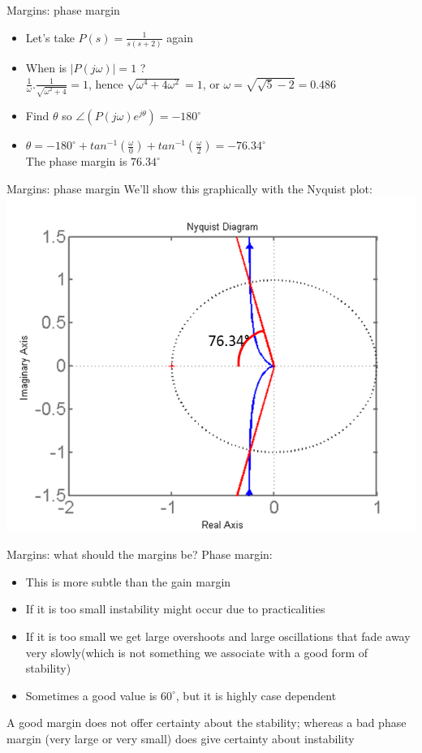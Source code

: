 \begin{frame}{Margins: phase margin}
\begin{itemize}
\item Let’s take $P(s) = \frac{1}{s(s+2)}$ again
\item When is $|P(j\omega)|=1$ ?
\\ $\frac{1}{\omega}.\frac{1}{\sqrt{\omega^2+4}} =1$, hence $\sqrt{\omega^4+4\omega^2}=1$, or $\omega= \sqrt{\sqrt{5}-2}=0.486$
\item Find $\theta$ so $\angle (P(j\omega)e^{j\theta}) = -180^{\circ}$
\item $\theta = -180^{\circ} + tan^{-1}(\frac{\omega}{0}) + tan^{-1}(\frac{\omega}{2}) = -76.34^{\circ}$ \\The phase margin is $76.34^{\circ}$
\end{itemize}
\end {frame}

\begin{frame}{Margins: phase margin}
We’ll show this graphically with the Nyquist plot:
\\ \includegraphics[width= 0.7\linewidth]{Afbeelding21}
\end {frame}

\begin{frame}{Margins: what should the margins be?}
Phase margin:
\begin{itemize}
\item This is more subtle than the gain margin
\item If it is too small instability might occur due to practicalities
\item If it is too small we get large overshoots and large oscillations that fade away very slowly(which is not something we associate with a good form of stability)
\item Sometimes a good value is $60^{\circ}$, but it is highly case dependent
\end{itemize}
A good margin does not offer certainty about the stability; whereas a bad phase margin (very large or very small) does give certainty about instability
\end {frame}

